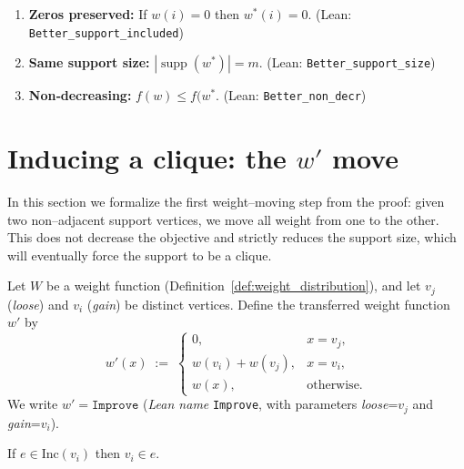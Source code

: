 \begin{lemma}
\label{lem:Better_props}
\leavevmode
\begin{enumerate}
  \item \textbf{Zeros preserved:} If \(w(i)=0\) then \(w^*(i)=0\).
        \hfill(Lean: \texttt{Better\_support\_included})
  \item \textbf{Same support size:}
        \(|\operatorname{supp}(w^*)|=m\).
        \hfill(Lean: \texttt{Better\_support\_size})
  \item \textbf{Non‐decreasing:}
        \(f(w)\le f(w^*\).
        \hfill(Lean: \texttt{Better\_non\_decr})
\end{enumerate}
\leanok
\end{lemma}

\section{Inducing a clique: the $w'$ move}

In this section we formalize the first weight–moving step from the proof:
given two non–adjacent support vertices, we move all weight from one to the
other.  This does not decrease the objective and strictly reduces the support
size, which will eventually force the support to be a clique.

\begin{definition}\label{def:Improve}
Let $W$ be a weight function (Definition~\ref{def:weight_distribution}), and let $v_j$ (\emph{loose}) and $v_i$ (\emph{gain}) be distinct vertices. Define the transferred weight function $w'$ by
\[
  w'(x)
  \;:=\;
  \begin{cases}
    0, & x=v_j,\\
    w(v_i)+w(v_j), & x=v_i,\\
    w(x), & \text{otherwise}.
  \end{cases}
\]
We write $w'=\texttt{Improve}$ (\emph{Lean name} \texttt{Improve}, with parameters \textit{loose}=$v_j$ and \textit{gain}=$v_i$).
\leanok
\uses{}
\end{definition}

\begin{lemma}\label{lem:helper-gain-mem}
If $e\in \mathrm{Inc}(v_i)$ then $v_i\in e$.
\leanok
\uses{}
\end{lemma}

